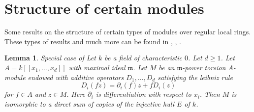 \documentclass{stacks-project}
\newenvironment{reference}{\comment}{\endcomment}
\theoremstyle{plain}
\newtheorem{lemma}[subsection]{Lemma}
\theoremstyle{definition}
\theoremstyle{remark}
\numberwithin{equation}{subsection}
\begin{document}
\section{Structure of certain modules}
\label{section-structure}

\noindent
Some results on the structure of certain types of
modules over regular local rings. These types of
results and much more can be found in
\cite{Huneke-Sharp}, \cite{Lyubeznik}, \cite{Lyubeznik2}.

\begin{lemma}
\label{lemma-structure-torsion-D-module-regular}
\begin{reference}
Special case of \cite[Theorem 2.4]{Lyubeznik}
\end{reference}
Let $k$ be a field of characteristic $0$. Let $d \geq 1$.
Let $A = k[[x_1, \ldots, x_d]]$ with maximal ideal $\mathfrak m$.
Let $M$ be an $\mathfrak m$-power torsion $A$-module endowed with
additive operators $D_1, \ldots, D_d$ satisfying the leibniz rule
$$
D_i(fz) = \partial_i(f) z + f D_i(z)
$$
for $f \in A$ and $z \in M$. Here $\partial_i$ is
differentiation with respect to $x_i$.
Then $M$ is isomorphic to a direct sum
of copies of the injective hull $E$ of $k$.
\end{lemma}
\end{document}
